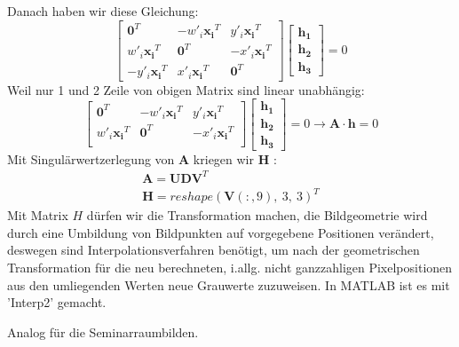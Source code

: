 \documentclass[12pt]{article}
\begin{document}
Danach haben wir diese Gleichung:
\begin{equation*}
\begin{bmatrix}
\bm{0}^T & -w'_i\bm{x_i}^T & y'_i\bm{x_i}^T \\
w'_i\bm{x_i}^T & \bm{0}^T & -x'_i\bm{x_i}^T \\
-y'_i\bm{x_i}^T & x'_i\bm{x_i}^T & \bm{0}^T 
\end{bmatrix} \begin{bmatrix}
\bm{h_1} \\
\bm{h_2} \\
\bm{h_3}
\end{bmatrix} = 0
\end{equation*}
Weil nur 1 und 2 Zeile von obigen Matrix sind linear unabhängig:
\begin{equation*}
\begin{bmatrix}
\bm{0}^T & -w'_i\bm{x_i}^T & y'_i\bm{x_i}^T \\
w'_i\bm{x_i}^T & \bm{0}^T & -x'_i\bm{x_i}^T \\
\end{bmatrix} \begin{bmatrix}
\bm{h_1} \\
\bm{h_2} \\
\bm{h_3}
\end{bmatrix} = 0 \longrightarrow \bm{A} \cdot \bm{h} = 0
\end{equation*}
Mit Singulärwertzerlegung von $\bm{A}$ kriegen wir $\bm{H}$ :
\begin{gather*}
\bm{A} = \bm{UD} \bm{V}^T \\
\bm{H} = reshape(\bm{V}(:,9),\ 3,\ 3)^T
\end{gather*}
Mit Matrix $H$ dürfen wir die Transformation machen, die Bildgeometrie wird durch eine Umbildung von Bildpunkten auf vorgegebene Positionen verändert, deswegen sind Interpolationsverfahren benötigt, um nach der geometrischen Transformation für die neu berechneten, i.allg. nicht ganzzahligen Pixelpositionen aus den umliegenden Werten neue Grauwerte zuzuweisen. In MATLAB ist es mit 'Interp2' gemacht. 
\begin{figure}[ht]\centering
\end{figure}
\newpage
Analog für die Seminarraumbilden.
\end{document}
